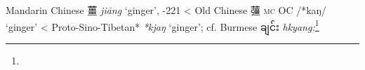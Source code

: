 \begin{etymology}\label{ety:jiang}
Mandarin Chinese {薑} \textit{jiāng} `ginger', -221
< Old Chinese {䕬} \textsc{mc} OC /*kaŋ/ `ginger'
< Proto-Sino-Tibetan* \textit{*kjaŋ} `ginger'; cf. Burmese ချင်း \textit{hkyang:}\footnote{}
\end{etymology}
